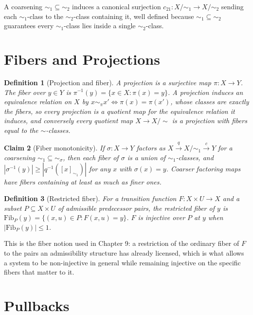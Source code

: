 \documentclass[12pt]{report}
\newtheorem{definition}{Definition}[section]
\newtheorem{claim}[definition]{Claim}
\begin{document}
A coarsening $\sim_1 \subseteq \sim_2$ induces a canonical surjection
$c_{21} : X/{\sim_1} \to X/{\sim_2}$ sending each $\sim_1$-class to the
$\sim_2$-class containing it, well defined because $\sim_1 \subseteq
\sim_2$ guarantees every $\sim_1$-class lies inside a single
$\sim_2$-class.

\section*{Fibers and Projections}

\begin{definition}[Projection and fiber]
A projection is a surjective map $\pi : X \to Y$. The fiber over $y \in
Y$ is $\pi^{-1}(y) = \{x \in X : \pi(x) = y\}$. A projection induces an
equivalence relation on $X$ by $x \sim_\pi x' \iff \pi(x) = \pi(x')$,
whose classes are exactly the fibers, so every projection is a quotient
map for the equivalence relation it induces, and conversely every
quotient map $X \to X/{\sim}$ is a projection with fibers equal to the
$\sim$-classes.
\end{definition}

\begin{claim}[Fiber monotonicity]
If $\sigma : X \to Y$ factors as $X \xrightarrow{q} X/{\sim_1}
\xrightarrow{c} Y$ for a coarsening $\sim_1 \subseteq \sim_\sigma$, then
each fiber of $\sigma$ is a union of $\sim_1$-classes, and $|\sigma^{-1}(y)|
\geq |q^{-1}([x]_{\sim_1})|$ for any $x$ with $\sigma(x) = y$. Coarser
factoring maps have fibers containing at least as much as finer ones.
\end{claim}

\begin{definition}[Restricted fiber]
For a transition function $F : X \times U \to X$ and a subset $P
\subseteq X \times U$ of admissible predecessor pairs, the restricted
fiber of $y$ is $\mathrm{Fib}_P(y) = \{(x,u) \in P : F(x,u) = y\}$. $F$
is injective over $P$ at $y$ when $|\mathrm{Fib}_P(y)| \leq 1$.
\end{definition}

This is the fiber notion used in Chapter 9: a restriction of the
ordinary fiber of $F$ to the pairs an admissibility structure has
already licensed, which is what allows a system to be non-injective in
general while remaining injective on the specific fibers that matter to
it.

\section*{Pullbacks}
\end{document}
